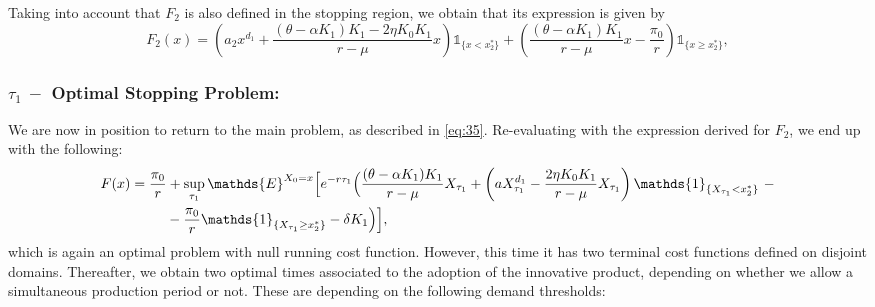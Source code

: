 Taking into account that $F_2$ is also defined in the stopping region, we obtain that its expression is given by
\begin{equation}
F_2(x)=\left( a_2 x^{d_1} +\frac{(\theta-\alpha K_1)K_1-2 \eta K_0 K_1}{r-\mu}x \right) \mathds{1}_{ \{ x<x_2^* \} }+ \left( \frac{(\theta-\alpha K_1)K_1}{r-\mu} x -\frac{\pi_0}{r} \right)\mathds{1}_{ \{ x\geq x_2^* \} },
\label{eq:f2}
\end{equation}

\subsubsection{$\tau_1 \ - $ Optimal Stopping Problem:}

We are now in position to return to the main problem, as described in \eqref{eq:35}. Re-evaluating with the expression derived for $F_2$, we end up with the following:
\begin{align}
F(x)&=\frac{\pi_0}{r}+\sup _{\tau_1} \mathds{E}^{X_0=x}  \Bigl[ e^{-r \tau_1}  \Bigl( \frac{(\theta-\alpha K_1)K_1}{r-\mu} X_{\tau_1}+ 
\left( a X_{\tau_1}^{d_1} -\frac{2 \eta K_0 K_1}{r-\mu} X_{\tau_1} \right) \mathds{1}_{ \{X_{\tau_1}<x_2^* \} } \ - \nonumber \\ 
& \hspace{0.9cm}-\frac{\pi_0}{r}\mathds{1}_{ \{ X_{\tau_1} \geq x_2^* \} }
-\delta K_1  \Bigr)  \Bigr],
\label{eq:f2x}
\end{align}
which is again an optimal problem with null running cost function. However, this time it has two terminal cost functions defined on disjoint domains. Thereafter, we obtain two optimal times associated to the adoption of the innovative product, depending on whether we allow a simultaneous production period or not. These are depending on the following demand thresholds: 


